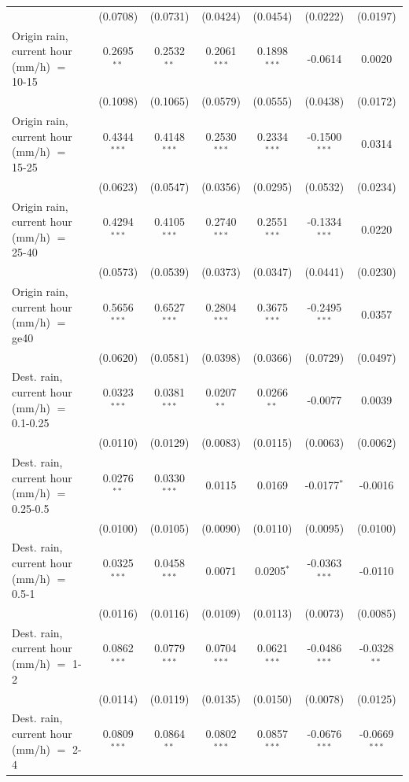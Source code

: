 \begin{tabular}{lcccccc}
    & (0.0708) & (0.0731) & (0.0424) & (0.0454) & (0.0222) & (0.0197)\\
   Origin rain, current hour (mm/h) $=$ 10-15 & 0.2695$^{**}$ & 0.2532$^{**}$ & 0.2061$^{***}$ & 0.1898$^{***}$ & -0.0614 & 0.0020\\
    & (0.1098) & (0.1065) & (0.0579) & (0.0555) & (0.0438) & (0.0172)\\
   Origin rain, current hour (mm/h) $=$ 15-25 & 0.4344$^{***}$ & 0.4148$^{***}$ & 0.2530$^{***}$ & 0.2334$^{***}$ & -0.1500$^{***}$ & 0.0314\\
    & (0.0623) & (0.0547) & (0.0356) & (0.0295) & (0.0532) & (0.0234)\\
   Origin rain, current hour (mm/h) $=$ 25-40 & 0.4294$^{***}$ & 0.4105$^{***}$ & 0.2740$^{***}$ & 0.2551$^{***}$ & -0.1334$^{***}$ & 0.0220\\
    & (0.0573) & (0.0539) & (0.0373) & (0.0347) & (0.0441) & (0.0230)\\
   Origin rain, current hour (mm/h) $=$ ge40 & 0.5656$^{***}$ & 0.6527$^{***}$ & 0.2804$^{***}$ & 0.3675$^{***}$ & -0.2495$^{***}$ & 0.0357\\
    & (0.0620) & (0.0581) & (0.0398) & (0.0366) & (0.0729) & (0.0497)\\
   Dest. rain, current hour (mm/h) $=$ 0.1-0.25 & 0.0323$^{***}$ & 0.0381$^{***}$ & 0.0207$^{**}$ & 0.0266$^{**}$ & -0.0077 & 0.0039\\
    & (0.0110) & (0.0129) & (0.0083) & (0.0115) & (0.0063) & (0.0062)\\
   Dest. rain, current hour (mm/h) $=$ 0.25-0.5 & 0.0276$^{**}$ & 0.0330$^{***}$ & 0.0115 & 0.0169 & -0.0177$^{*}$ & -0.0016\\
    & (0.0100) & (0.0105) & (0.0090) & (0.0110) & (0.0095) & (0.0100)\\
   Dest. rain, current hour (mm/h) $=$ 0.5-1 & 0.0325$^{***}$ & 0.0458$^{***}$ & 0.0071 & 0.0205$^{*}$ & -0.0363$^{***}$ & -0.0110\\
    & (0.0116) & (0.0116) & (0.0109) & (0.0113) & (0.0073) & (0.0085)\\
   Dest. rain, current hour (mm/h) $=$ 1-2 & 0.0862$^{***}$ & 0.0779$^{***}$ & 0.0704$^{***}$ & 0.0621$^{***}$ & -0.0486$^{***}$ & -0.0328$^{**}$\\
    & (0.0114) & (0.0119) & (0.0135) & (0.0150) & (0.0078) & (0.0125)\\
   Dest. rain, current hour (mm/h) $=$ 2-4 & 0.0809$^{***}$ & 0.0864$^{**}$ & 0.0802$^{***}$ & 0.0857$^{***}$ & -0.0676$^{***}$ & -0.0669$^{***}$\\

\end{tabular}
